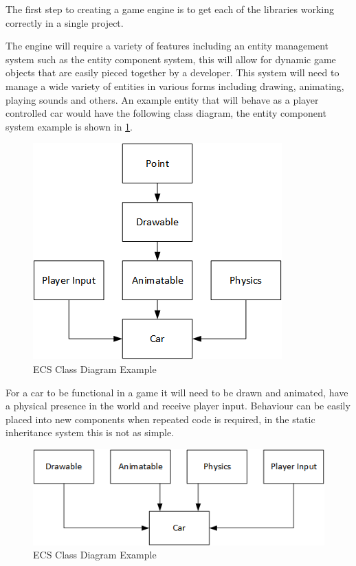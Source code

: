 \documentclass[11pt,a4paper,titlepage]{article}
\begin{document}

	The first step to creating a game engine is to get each of the libraries working correctly in a single project.

	The engine will require a variety of features including an entity management system such as the entity component system, this will allow for dynamic game objects that are easily pieced together by a developer. This system will need to manage a wide variety of entities in various forms including drawing, animating, playing sounds and others. An example entity that will behave as a player controlled car would have the following class diagram, the entity component system example is shown in \ref{fig:ClassDiagram1}.

	\begin{figure}[h] 
		\centering
		\includegraphics[scale=0.75]{ECS1}
		\caption{ECS Class Diagram Example}
		\label{fig:ClassDiagram1}
	\end{figure}

	For a car to be functional in a game it will need to be drawn and animated, have a physical presence in the world and receive player input. Behaviour can be easily placed into new components when repeated code is required, in the static inheritance system this is not as simple.

	\begin{figure}[h]
		\centering
		\includegraphics[scale=0.75]{ECS2}
		\caption{ECS Class Diagram Example}
		\label{fig:ClassDiagram2}
	\end{figure}
\end{document}
